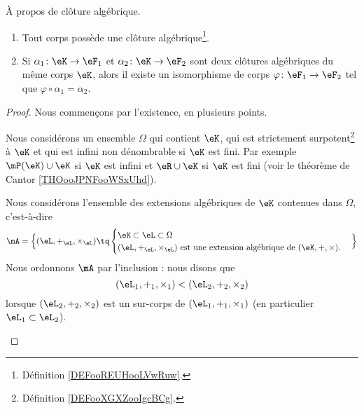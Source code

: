 \begin{theorem}       \label{THOooEDQKooLEGlDv}
	À propos de clôture algébrique.
	\begin{enumerate}
		\item
		      Tout corps possède une clôture algébrique\footnote{Définition \ref{DEFooREUHooLVwRuw}.}.
		\item
		      Si \( \alpha_1\colon \eK\to \eF_1\) et \( \alpha_2\colon \eK\to \eF_2\) sont deux clôtures algébriques du même corps \( \eK\), alors il existe un isomorphisme de corps \( \varphi\colon \eF_1\to \eF_2\) tel que \( \varphi\circ\alpha_1=\alpha_2\).
	\end{enumerate}
\end{theorem}

\begin{proof}
	Nous commençons par l'existence, en plusieurs points.
	\begin{subproof}
		\spitem[Un ensemble]
		Nous considérons un ensemble \( \Omega\) qui contient \( \eK\), qui est strictement surpotent\footnote{Définition \ref{DEFooXGXZooIgcBCg}.} à \( \eK\) et qui est infini non dénombrable si \( \eK\) est fini. Par exemple \( \mP(\eK)\cup \eK\) si \( \eK\) est infini et \( \eR\cup \eK\) si \( \eK\) est fini (voir le théorème de Cantor \ref{THOooJPNFooWSxUhd}).

		Nous considérons l'ensemble des extensions algébriques de \( \eK\) contenues dans \( \Omega\), c'est-à-dire
		\begin{equation}
			\mA=\Big\{  (\eL, +_{\eL}, \times_{\eL})  \tq
			\begin{cases}
				\eK\subset \eL\subset \Omega \\
				(\eL, +_{\eL}, \times_{\eL}) \text{ est une extension algébrique de } (\eK, +, \times).
			\end{cases}
			\Big\}
		\end{equation}
		Nous ordonnons \( \mA\) par l'inclusion : nous disons que
		\begin{equation}
			(\eL_1, +_{1}, \times_1)< (\eL_2,+_2,\times_2)
		\end{equation}
		lorsque \( (\eL_2, +_2, \times_2)\) est un sur-corps de \( (\eL_1,+_1,\times_1)\) (en particulier \( \eL_1\subset \eL_2\)).


\end{subproof}
\end{proof}
